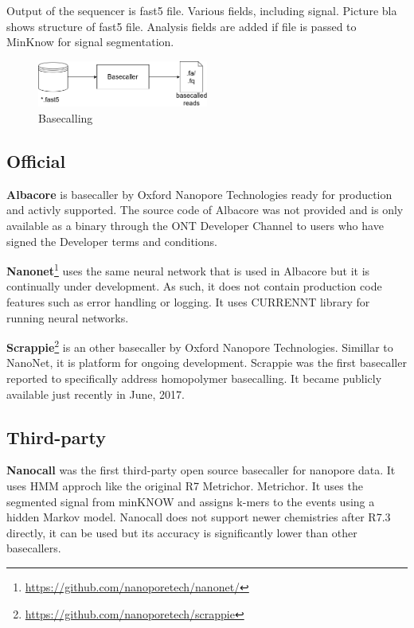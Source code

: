 \documentclass[times, utf8, diplomski, numeric, english]{fer}
\begin{document}
Output of the sequencer is fast5 file. Various fields, including signal.
Picture bla shows structure of fast5 file. Analysis fields are added if file is passed to MinKnow for signal segmentation.

\begin{figure}[!ht]
	\begin{center}
		\includegraphics[width=0.5\textwidth]{./imgs/basecalling.png}
		\caption{Basecalling}
		\label{fg:basecalling}
	\end{center}
\end{figure}

\subsection{Official}
\textbf{Albacore} is basecaller by Oxford Nanopore Technologies ready for production and activly supported.
The source code of Albacore was not provided and is only available as a binary through the ONT Developer Channel to users who have signed the Developer terms and conditions. 

\textbf{Nanonet}\footnote{\url{https://github.com/nanoporetech/nanonet/}} uses the same neural network that is used in Albacore but it is continually under development. As such, it does not contain production code features such as error handling or logging. It uses CURRENNT library for running neural networks.


\textbf{Scrappie}\footnote{\url{https://github.com/nanoporetech/scrappie}} is an other basecaller by Oxford Nanopore Technologies. Simillar to NanoNet, it is platform for ongoing development. Scrappie was the first basecaller reported to specifically address homopolymer basecalling. It became publicly available just recently in June, 2017.

\subsection{Third-party}

\textbf{Nanocall}\cite{David046086} was the first third-party open source basecaller for nanopore data. It uses HMM approch like the original R7 Metrichor. Metrichor. It uses the segmented signal from minKNOW and assigns k-mers to the events using a hidden Markov model. 
Nanocall does not support newer chemistries after R7.3 directly, it can be used but its accuracy is significantly lower than other basecallers.
 
\end{document}
